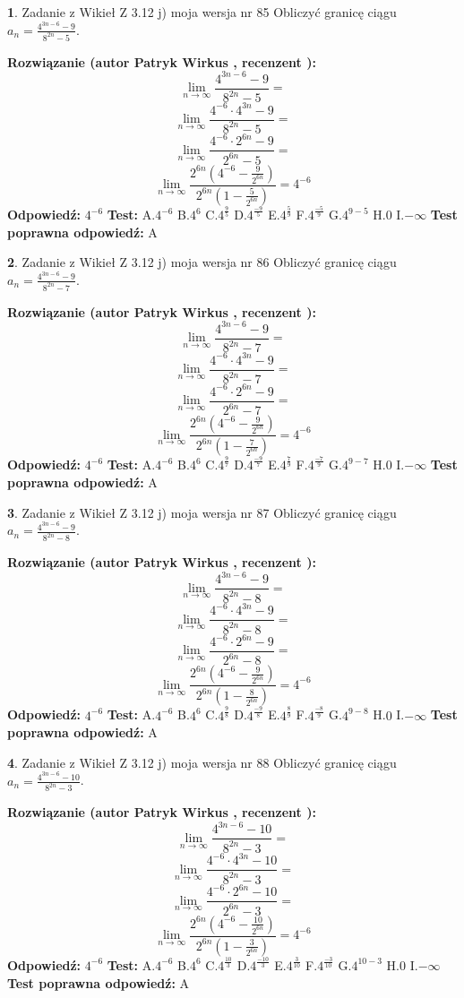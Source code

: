 \documentclass[12pt, a4paper]{article}
\theoremstyle{definition} %
\newtheorem{zad}{}
\newcommand{\zadStart}[1]{\begin{zad}#1\newline}
\newcommand{\zadStop}{\end{zad}}
\newcommand{\rozwStart}[2]{\noindent \textbf{Rozwiązanie (autor #1 , recenzent #2): }\newline}
\newcommand{\rozwStop}{\newline}
\newcommand{\odpStart}{\noindent \textbf{Odpowiedź:}\newline}
\newcommand{\odpStop}{\newline}
\newcommand{\testStart}{\noindent \textbf{Test:}\newline}
\newcommand{\testStop}{\newline}
\newcommand{\kluczStart}{\noindent \textbf{Test poprawna odpowiedź:}\newline}
\newcommand{\kluczStop}{\newline}
\begin{document}
\zadStart{Zadanie z Wikieł Z 3.12 j) moja wersja nr 85}
Obliczyć granicę ciągu $a_{n}=\frac{4^{3n-6}-9}{8^{2n}-5}$.
\zadStop
\rozwStart{Patryk Wirkus}{}
$$\lim\limits_{n\to\infty}\frac{4^{3n-6}-9}{8^{2n}-5}=$$
$$\lim\limits_{n\to\infty}\frac{4^{-6} \cdot 4^{3n}-9}{8^{2n}-5}=$$
$$\lim\limits_{n\to\infty}\frac{4^{-6} \cdot 2^{6n}-9}{2^{6n}-5}=$$
$$\lim\limits_{n\to\infty}\frac{2^{6n}(4^{-6} - \frac{9}{2^{6n}})}{2^{6n}(1-\frac{5}{2^{6n}})}= 4^{-6}$$
\rozwStop
\odpStart
$4^{-6}$
\odpStop
\testStart
A.$4^{-6}$
B.$4^{6}$
C.$4^{\frac{9}{5}}$
D.$4^{\frac{-9}{5}}$
E.$4^{\frac{5}{9}}$
F.$4^{\frac{-5}{9}}$
G.$4^{9-5}$
H.$0$
I.$-\infty$
\testStop
\kluczStart
A
\kluczStop



\zadStart{Zadanie z Wikieł Z 3.12 j) moja wersja nr 86}
Obliczyć granicę ciągu $a_{n}=\frac{4^{3n-6}-9}{8^{2n}-7}$.
\zadStop
\rozwStart{Patryk Wirkus}{}
$$\lim\limits_{n\to\infty}\frac{4^{3n-6}-9}{8^{2n}-7}=$$
$$\lim\limits_{n\to\infty}\frac{4^{-6} \cdot 4^{3n}-9}{8^{2n}-7}=$$
$$\lim\limits_{n\to\infty}\frac{4^{-6} \cdot 2^{6n}-9}{2^{6n}-7}=$$
$$\lim\limits_{n\to\infty}\frac{2^{6n}(4^{-6} - \frac{9}{2^{6n}})}{2^{6n}(1-\frac{7}{2^{6n}})}= 4^{-6}$$
\rozwStop
\odpStart
$4^{-6}$
\odpStop
\testStart
A.$4^{-6}$
B.$4^{6}$
C.$4^{\frac{9}{7}}$
D.$4^{\frac{-9}{7}}$
E.$4^{\frac{7}{9}}$
F.$4^{\frac{-7}{9}}$
G.$4^{9-7}$
H.$0$
I.$-\infty$
\testStop
\kluczStart
A
\kluczStop



\zadStart{Zadanie z Wikieł Z 3.12 j) moja wersja nr 87}
Obliczyć granicę ciągu $a_{n}=\frac{4^{3n-6}-9}{8^{2n}-8}$.
\zadStop
\rozwStart{Patryk Wirkus}{}
$$\lim\limits_{n\to\infty}\frac{4^{3n-6}-9}{8^{2n}-8}=$$
$$\lim\limits_{n\to\infty}\frac{4^{-6} \cdot 4^{3n}-9}{8^{2n}-8}=$$
$$\lim\limits_{n\to\infty}\frac{4^{-6} \cdot 2^{6n}-9}{2^{6n}-8}=$$
$$\lim\limits_{n\to\infty}\frac{2^{6n}(4^{-6} - \frac{9}{2^{6n}})}{2^{6n}(1-\frac{8}{2^{6n}})}= 4^{-6}$$
\rozwStop
\odpStart
$4^{-6}$
\odpStop
\testStart
A.$4^{-6}$
B.$4^{6}$
C.$4^{\frac{9}{8}}$
D.$4^{\frac{-9}{8}}$
E.$4^{\frac{8}{9}}$
F.$4^{\frac{-8}{9}}$
G.$4^{9-8}$
H.$0$
I.$-\infty$
\testStop
\kluczStart
A
\kluczStop



\zadStart{Zadanie z Wikieł Z 3.12 j) moja wersja nr 88}
Obliczyć granicę ciągu $a_{n}=\frac{4^{3n-6}-10}{8^{2n}-3}$.
\zadStop
\rozwStart{Patryk Wirkus}{}
$$\lim\limits_{n\to\infty}\frac{4^{3n-6}-10}{8^{2n}-3}=$$
$$\lim\limits_{n\to\infty}\frac{4^{-6} \cdot 4^{3n}-10}{8^{2n}-3}=$$
$$\lim\limits_{n\to\infty}\frac{4^{-6} \cdot 2^{6n}-10}{2^{6n}-3}=$$
$$\lim\limits_{n\to\infty}\frac{2^{6n}(4^{-6} - \frac{10}{2^{6n}})}{2^{6n}(1-\frac{3}{2^{6n}})}= 4^{-6}$$
\rozwStop
\odpStart
$4^{-6}$
\odpStop
\testStart
A.$4^{-6}$
B.$4^{6}$
C.$4^{\frac{10}{3}}$
D.$4^{\frac{-10}{3}}$
E.$4^{\frac{3}{10}}$
F.$4^{\frac{-3}{10}}$
G.$4^{10-3}$
H.$0$
I.$-\infty$
\testStop
\kluczStart
A
\kluczStop
\end{document}
